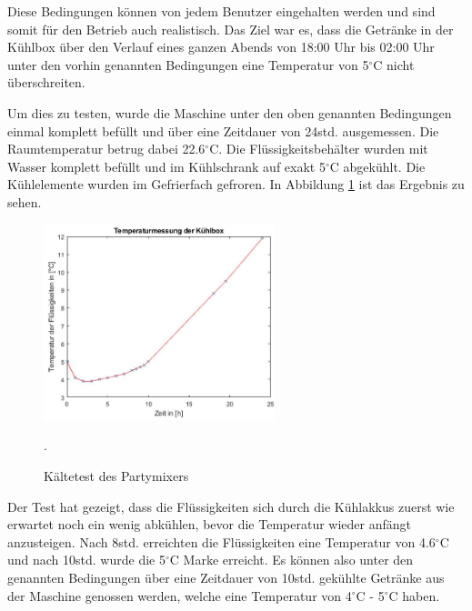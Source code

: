 Diese Bedingungen können von jedem Benutzer eingehalten werden und sind somit für den Betrieb auch realistisch. Das Ziel war es, dass die Getränke in der Kühlbox über den Verlauf eines ganzen Abends von 18:00 Uhr bis 02:00 Uhr unter den vorhin genannten Bedingungen eine Temperatur von 5$^\circ$C nicht überschreiten. 

Um dies zu testen, wurde die Maschine unter den oben genannten Bedingungen einmal komplett befüllt und über eine Zeitdauer von 24std. ausgemessen. Die Raumtemperatur betrug dabei 22.6$^\circ$C. Die Flüssigkeitsbehälter wurden mit Wasser komplett befüllt und im Kühlschrank auf exakt 5$^\circ$C abgekühlt. Die Kühlelemente wurden im Gefrierfach gefroren. In Abbildung \ref{fig:Kaeltetest} ist das Ergebnis zu sehen.

\begin{figure}[H]
	\centering
	\includegraphics [width=0.6\textwidth]{graphics/Kaeltetest}
	\caption{Kältetest des Partymixers}.
	\label{fig:Kaeltetest}
\end{figure} 

Der Test hat gezeigt, dass die Flüssigkeiten sich durch die Kühlakkus zuerst wie erwartet noch ein wenig abkühlen, bevor die Temperatur wieder anfängt anzusteigen. Nach 8std. erreichten die Flüssigkeiten eine Temperatur von 4.6$^\circ$C und nach 10std. wurde die 5$^\circ$C Marke erreicht. Es können also unter den genannten Bedingungen über eine Zeitdauer von 10std. gekühlte Getränke aus der Maschine genossen werden, welche eine Temperatur von 4$^\circ$C - 5$^\circ$C haben.  





